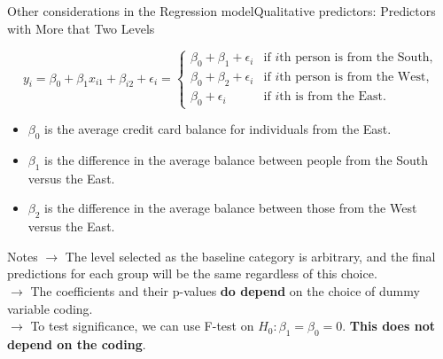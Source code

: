 \begin{frame}{Other considerations in the Regression model}{Qualitative predictors: Predictors with More that Two Levels}

\begin{equation*}
        y_i = \beta_0 + \beta_1 x_{i1} + \beta_{i2} + \epsilon_i = 
        \begin{cases}
        \beta_0 + \beta_1 + \epsilon_i & \text{if $i$th person is from the South,} \\
        \beta_0 + \beta_2 + \epsilon_i & \text{if $i$th person is from the West,} \\
        \beta_0 + \epsilon_i & \text{if $i$th is from the East.}
        \end{cases}
\end{equation*}

\begin{itemize}
    \item $\beta_0$ is the average credit card balance for individuals from the East. \pause
    \item $\beta_1$ is the diﬀerence in the average balance between people from the South versus the East. \pause
    \item $\beta_2$ is the diﬀerence in the average balance between those from the West versus the East.
\end{itemize}

\begin{block}{Notes}
    $\rightarrow$ The level selected as the baseline category is arbitrary, and the final predictions for each group will be the same regardless of this choice. \\ \pause
    $\rightarrow$ The coeﬃcients and their p-values \textbf{do depend} on the choice of dummy variable coding. \\ \pause
    $\rightarrow$ To test significance, we can use F-test on $H_0: \beta_1 = \beta_0 = 0$. \textbf{This does not depend on the coding}. 
\end{block}

\end{frame}